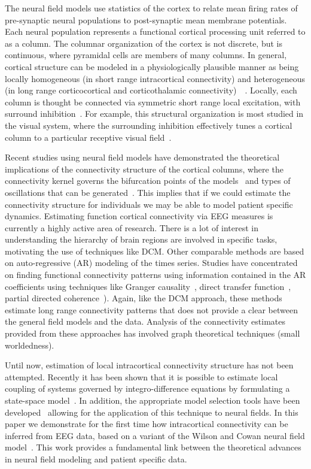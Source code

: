 \documentclass[journal]{IEEEtran}
\begin{document}
The neural field models use statistics of the cortex to relate mean firing rates of pre-synaptic neural populations to post-synaptic mean membrane potentials. Each neural population represents a functional cortical processing unit referred to as a column. The columnar organization of the cortex is not discrete, but is continuous, where pyramidal cells are members of many columns. In general, cortical structure can be modeled in a physiologically plausible manner as being locally homogeneous (in short range intracortical connectivity) and heterogeneous (in long range corticocortical and corticothalamic connectivity)~\cite{Jirsa2009}~\cite{Qubbaj2007}. Locally, each column is thought be connected via symmetric short range local excitation, with surround inhibition~\cite{Braitenberg1998}. For example, this structural organization is most studied in the visual system, where the surrounding inhibition effectively tunes a cortical column to a particular receptive visual field~\cite{Sullivan2006}.

Recent studies using neural field models have demonstrated the theoretical implications of the connectivity structure of the cortical columns, where the connectivity kernel governs the bifurcation points of the models~\cite{Hutt2005} and types of oscillations that can be generated~\cite{Schmidt2009}. This implies that if we could estimate the connectivity structure for individuals we may be able to model patient specific dynamics. Estimating function cortical connectivity via EEG measures is currently a highly active area of research. There is a lot of interest in understanding the hierarchy of brain regions are involved in specific tasks, motivating the use of techniques like DCM. Other comparable methods are based on auto-regressive (AR) modeling of the times series. Studies have concentrated on finding functional connectivity patterns using information contained in the AR coefficients using techniques like Granger causality~\cite{Hesse2003}, direct transfer function~\cite{Kaminski1991}, partial directed coherence~\cite{Sameshima1999}). Again, like the DCM approach, these methods estimate long range connectivity patterns that does not provide a clear between the general field models and the data. Analysis of the connectivity estimates provided from these approaches has involved graph theoretical techniques (small worldedness).

Until now, estimation of local intracortical connectivity structure has not been attempted. Recently it has been shown that it is possible to estimate local coupling of systems governed by integro-difference equations by formulating a state-space model~\cite{Dewar2009}. In addition, the appropriate model selection tools have been developed~\cite{Scerri2009} allowing for the application of this technique to neural fields. In this paper we demonstrate for the first time how intracortical connectivity can be inferred from EEG data, based on a variant of the  Wilson and Cowan neural field model~\cite{Wilson1973}. This work provides a fundamental link between the theoretical advances in neural field modeling and patient specific data.
\end{document}
